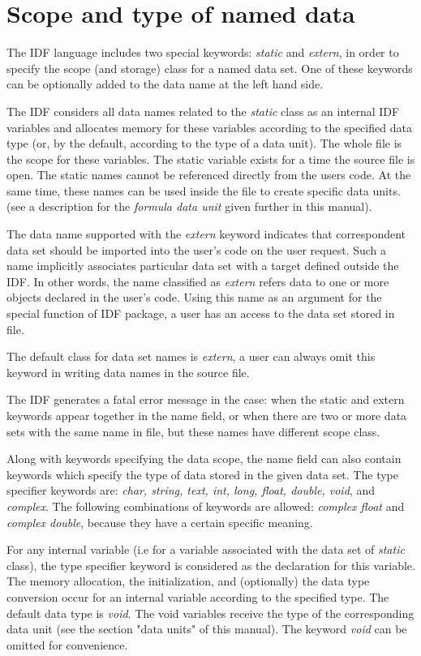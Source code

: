 \section{Scope and type of named data}

The IDF language includes two special keywords: {\it static} and {\it extern},
in order to specify the scope (and storage) class for a named data set.
One of these keywords can be optionally added to the data name 
at the left hand side.  
 
The IDF considers all data names related to the {\it static} class as
an internal IDF variables and allocates memory for these
variables according to the specified data type 
(or, by the default, according to the type of a data unit).
The whole file is the scope for these variables. 
The static variable exists for a time the source file is open.
The static names cannot be referenced directly from the users code.
At the same time, these names can be used inside the file
to create specific data units.
(see a description for the {\it formula data unit} 
given further in this manual).  

The data name supported with the {\it extern} keyword indicates
that correspondent data set should be imported into the user's code
on the user request.
Such a name implicitly associates particular data set 
with a target defined outside the IDF.
In other words,
the name classified as {\it extern} refers data
to one or more objects declared in the user's code. 
Using this name as an argument for the special function
of IDF package,
a user has an access to the data set stored in file.

The default class for data set names is {\it extern}, 
a user can always omit this keyword in writing data names
in the source file.

The IDF generates a fatal error message in the case: 
when the static and extern keywords appear together in the name field,
or when there are two or more data sets with the same name in file,
but these names have different scope class.

Along with keywords specifying the data scope,
the name field can also contain keywords which specify the type
of data stored in the given data set.
The type specifier keywords are: 
{\it char, string, text, int, long,
float, double, void}, and {\it complex}.
The following combinations of keywords are allowed: 
{\it complex float} and {\it complex double},
because they have a certain specific meaning.

For any internal variable 
(i.e for a variable associated with the data set of {\it static} class),
the type specifier keyword is considered as the declaration for this variable.
The memory allocation, the initialization, 
and (optionally) the data type conversion 
occur for an internal variable according to the specified type.
The default data type is {\it void}. The void variables
receive the type of the corresponding data unit 
(see the section "data units" of this manual).
The keyword {\it void} can be omitted for convenience. 

